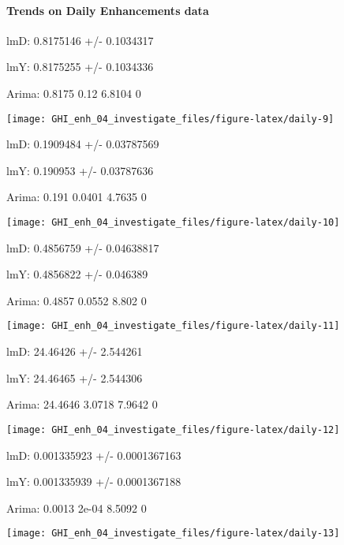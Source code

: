 \documentclass[
  10pt,
  a4paper,oneside]{article}
\begin{document}
\newpage

\hypertarget{trends-on-daily-enhancements-data}{%
\paragraph{Trends on Daily Enhancements data}\label{trends-on-daily-enhancements-data}}

lmD: 0.8175146 +/- 0.1034317

lmY: 0.8175255 +/- 0.1034336

Arima: 0.8175 0.12 6.8104 0

\begin{center}\texttt{[image: GHI\_enh\_04\_investigate\_files/figure-latex/daily-9]} \end{center}

lmD: 0.1909484 +/- 0.03787569

lmY: 0.190953 +/- 0.03787636

Arima: 0.191 0.0401 4.7635 0

\begin{center}\texttt{[image: GHI\_enh\_04\_investigate\_files/figure-latex/daily-10]} \end{center}

lmD: 0.4856759 +/- 0.04638817

lmY: 0.4856822 +/- 0.046389

Arima: 0.4857 0.0552 8.802 0

\begin{center}\texttt{[image: GHI\_enh\_04\_investigate\_files/figure-latex/daily-11]} \end{center}

lmD: 24.46426 +/- 2.544261

lmY: 24.46465 +/- 2.544306

Arima: 24.4646 3.0718 7.9642 0

\begin{center}\texttt{[image: GHI\_enh\_04\_investigate\_files/figure-latex/daily-12]} \end{center}

lmD: 0.001335923 +/- 0.0001367163

lmY: 0.001335939 +/- 0.0001367188

Arima: 0.0013 2e-04 8.5092 0

\begin{center}\texttt{[image: GHI\_enh\_04\_investigate\_files/figure-latex/daily-13]} \end{center}
\end{document}
